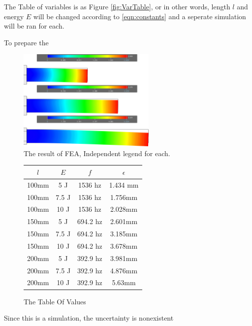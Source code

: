\documentclass[a4paper,12pt]{article}
\begin{document}
    The Table of variables is as Figure \ref{fig:VarTable}, or in other words, length $l$ and energy $E$ will be changed according to \eqref{eqn:constants} and a seperate simulation will be ran for each.

    To prepare the
    \begin{figure}[h]
    \includegraphics[width=0.6\textwidth]{FEA3}
    \centering
    \caption{The result of FEA, Independent legend for each.}
    \centering
    \end{figure}
    \begin{figure}[h]%
    \begin{center}
    \begin{tabular}{|c|c||c|c|}
    \hline
    $l$ & $E$ & $f$& $\epsilon$ \\
    \hline\hline
    100mm & 5 J & 1536 hz & 1.434 mm \\
    \hline
    100mm & 7.5 J & 1536 hz & 1.756mm \\
    \hline
    100mm & 10 J & 1536 hz & 2.028mm \\
    \hline
    150mm & 5 J & 694.2 hz & 2.601mm \\
    \hline
    150mm & 7.5 J & 694.2 hz & 3.185mm \\
    \hline
    150mm & 10 J & 694.2 hz & 3.678mm \\
    \hline
    200mm & 5 J & 392.9 hz & 3.981mm \\
    \hline
    200mm & 7.5 J & 392.9 hz & 4.876mm \\
    \hline
    200mm & 10 J & 392.9 hz & 5.63mm \\
    \hline


    \end{tabular}
    \end{center}
    \caption{The Table Of Values}\label{fig:FEAtable}
    \end{figure}

    Since this is a simulation, the uncertainty is nonexistent
\end{document}
